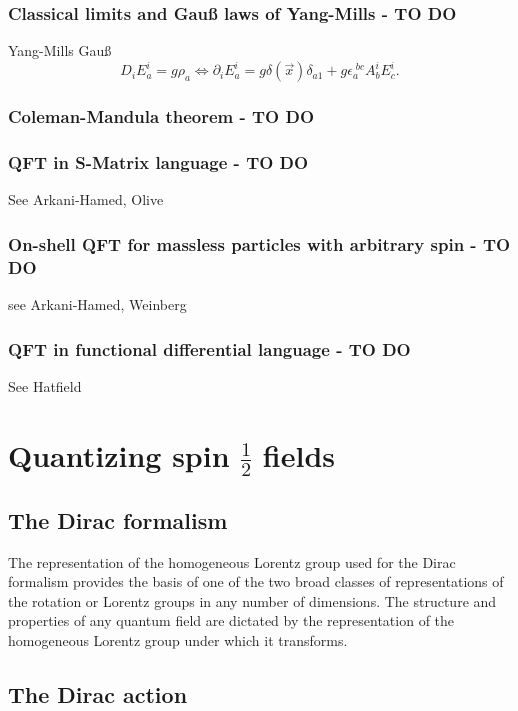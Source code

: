 \subsection{Classical limits and Gauß laws of Yang-Mills - TO DO}
\begin{mybox}{}
	Yang-Mills Gauß
	\begin{equation}
		D_i E^i_a = g \rho_a \Leftrightarrow \partial_i E^i_a = g \delta(\vec{x}) \delta_{a 1} + g \epsilon^{\;bc}_a A^i_b E^i_c.
	\end{equation}
\end{mybox}

\subsection{Coleman-Mandula theorem - TO DO}
\subsection{QFT in S-Matrix language - TO DO}
See Arkani-Hamed, Olive
\subsection{On-shell QFT for massless particles with arbitrary spin - TO DO}
see Arkani-Hamed, Weinberg
\subsection{QFT in functional differential language - TO DO}
See Hatfield
\newpage



\chapter{Quantizing spin $\frac{1}{2}$ fields}
\section{The Dirac formalism}
The representation of the homogeneous Lorentz group used for the Dirac formalism provides the basis of one of the two broad classes of representations of the rotation or Lorentz groups in any number of dimensions. The structure and properties of any quantum field are dictated by the representation of the homogeneous Lorentz group under which it transforms. 





\section{The Dirac action}

